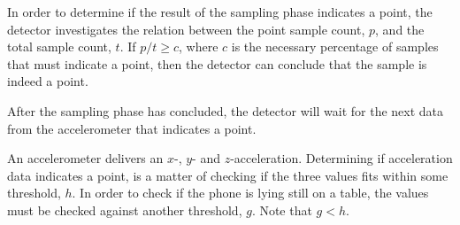 In order to determine if the result of the sampling phase indicates a point, 
the detector investigates the relation between the point sample count, $p$, 
and the total sample count, $t$. 
If $p/t \geq c$, where $c$ is the necessary percentage of samples that must indicate a point, 
then the detector can conclude that the sample is indeed a point.

After the sampling phase has concluded, 
the detector will wait for the next data from the accelerometer that indicates a point.

An accelerometer delivers an $x$-, $y$- and $z$-acceleration. 
Determining if acceleration data indicates a point, 
is a matter of checking if the three values fits within some threshold, $h$. 
In order to check if the phone is lying still on a table, 
the values must be checked against another threshold, $g$. Note that $g < h$.

